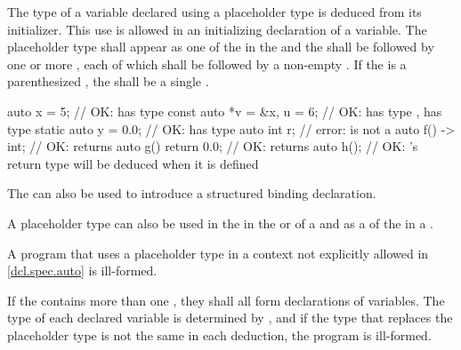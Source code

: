 \pnum
The type of a variable declared using a placeholder type is
deduced from its initializer.
This use is allowed
in an initializing declaration of a variable.
The placeholder type shall appear as one of the
 in the
 and the
shall be followed by one or more
,
each of which shall
be followed by a non-empty
.
If the  is a parenthesized ,
the  shall be a single .
\begin{example}
\begin{codeblock}
auto x = 5;                     // OK:  has type 
const auto *v = &x, u = 6;      // OK:  has type ,  has type 
static auto y = 0.0;            // OK:  has type 
auto int r;                     // error:  is not a 
auto f() -> int;                // OK:  returns 
auto g() { return 0.0; }        // OK:  returns 
auto h();                       // OK: 's return type will be deduced when it is defined
\end{codeblock}
\end{example}
The  
can also be used to introduce
a structured binding declaration.

\pnum
A placeholder type can also be used
in the  in
the  or  of a
and as a 
of the 
in a .

\pnum
A program that uses a placeholder type in a context not
explicitly allowed in \ref{dcl.spec.auto} is ill-formed.

\pnum
If the  contains more than one
, they shall all form declarations of
variables. The type of each declared variable is determined
by ,
and if the type that replaces the placeholder type is not the
same in each deduction, the program is ill-formed.


